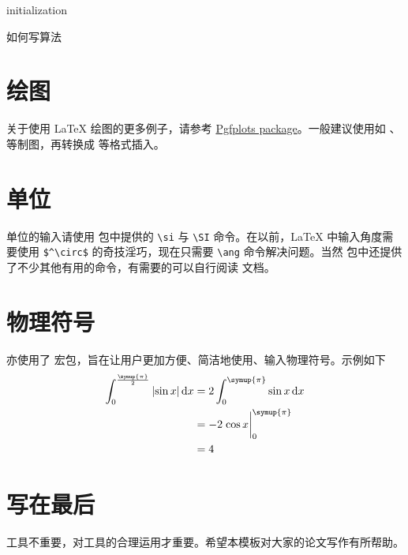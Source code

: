 \begin{algorithm}
  \SetAlgoLined
  initialization\;
  \caption{如何写算法}\label{alg:alg1}
\end{algorithm}

\section{绘图}
关于使用 \LaTeX{} 绘图的更多例子，请参考 \href{https://www.overleaf.com/learn/latex/Pgfplots_package}{Pgfplots package}。一般建议使用如 、 等制图，再转换成  等格式插入。

\section{单位}
单位的输入请使用  包中提供的 \verb|\si| 与 \verb|\SI| 命令。在以前，\LaTeX{} 中输入角度需要使用 \verb|$^\circ$| 的奇技淫巧，现在只需要 \verb|\ang| 命令解决问题。当然  包中还提供了不少其他有用的命令，有需要的可以自行阅读  文档。

\section{物理符号}
\WhuThesis 亦使用了  宏包，旨在让用户更加方便、简洁地使用、输入物理符号。示例如下
\begin{equation}
  \begin{aligned}
    \int_0^\frac{\symup{\pi}}{2} \abs{\sin{x}} \dd{x} & = 2 \int_0^{\symup{\pi}} \sin{x} \dd{x} \\
                                                      & = -2 \eval{\cos{x}}_0^{\symup{\pi}}     \\
                                                      & = 4
  \end{aligned}
\end{equation}

\section{写在最后}
工具不重要，对工具的合理运用才重要。希望本模板对大家的论文写作有所帮助。
